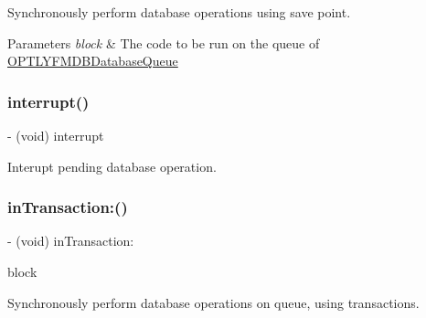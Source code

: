 Synchronously perform database operations using save point.


\begin{DoxyParams}{Parameters}
{\em block} & The code to be run on the queue of {\ttfamily \mbox{\hyperlink{interface_o_p_t_l_y_f_m_d_b_database_queue}{O\+P\+T\+L\+Y\+F\+M\+D\+B\+Database\+Queue}}} \\
\hline
\end{DoxyParams}
\mbox{\label{interface_o_p_t_l_y_f_m_d_b_database_queue_aabcbc11840a3e9e384ca5a6503292ef5}} 
\subsubsection{\texorpdfstring{interrupt()}{interrupt()}}
{\footnotesize\ttfamily -\/ (void) interrupt \begin{DoxyParamCaption}{ }\end{DoxyParamCaption}}

Interupt pending database operation. \mbox{\label{interface_o_p_t_l_y_f_m_d_b_database_queue_a2b3f5f9d9820bb35c8b199bf0f551f2f}} 
\subsubsection{\texorpdfstring{in\+Transaction\+:()}{inTransaction:()}}
{\footnotesize\ttfamily -\/ (void) in\+Transaction\+: \begin{DoxyParamCaption}\item[{(\+\_\+\+\_\+attribute\+\_\+\+\_\+((noescape)) void($^\wedge$)(\mbox{\hyperlink{interface_o_p_t_l_y_f_m_d_b_database}{O\+P\+T\+L\+Y\+F\+M\+D\+B\+Database}} $\ast$db, B\+O\+OL $\ast$rollback))}]{block }\end{DoxyParamCaption}}

Synchronously perform database operations on queue, using transactions.



